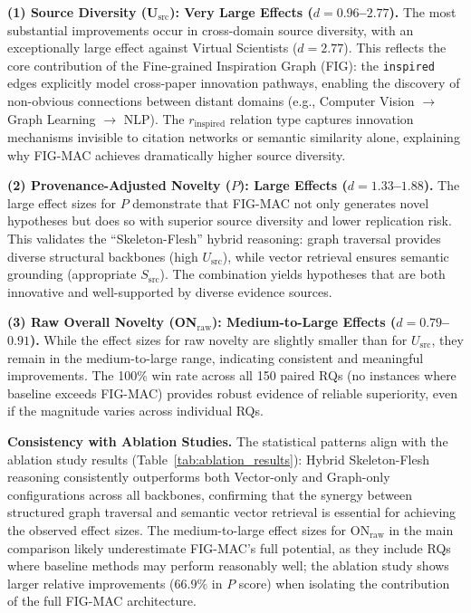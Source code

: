 \documentclass[runningheads]{llncs}
\begin{document}
\textbf{(1) Source Diversity (U$_{\text{src}}$): Very Large Effects ($d = 0.96$--$2.77$).} The most substantial improvements occur in cross-domain source diversity, with an exceptionally large effect against Virtual Scientists ($d = 2.77$). This reflects the core contribution of the Fine-grained Inspiration Graph (FIG): the \texttt{inspired} edges explicitly model cross-paper innovation pathways, enabling the discovery of non-obvious connections between distant domains (e.g., Computer Vision $\rightarrow$ Graph Learning $\rightarrow$ NLP). The $r_{\text{inspired}}$ relation type captures innovation mechanisms invisible to citation networks or semantic similarity alone, explaining why FIG-MAC achieves dramatically higher source diversity.

\textbf{(2) Provenance-Adjusted Novelty ($P$): Large Effects ($d = 1.33$--$1.88$).} The large effect sizes for $P$ demonstrate that FIG-MAC not only generates novel hypotheses but does so with superior source diversity and lower replication risk. This validates the ``Skeleton-Flesh'' hybrid reasoning: graph traversal provides diverse structural backbones (high $U_{\text{src}}$), while vector retrieval ensures semantic grounding (appropriate $S_{\text{src}}$). The combination yields hypotheses that are both innovative and well-supported by diverse evidence sources.

\textbf{(3) Raw Overall Novelty (ON$_{\text{raw}}$): Medium-to-Large Effects ($d = 0.79$--$0.91$).} While the effect sizes for raw novelty are slightly smaller than for $U_{\text{src}}$, they remain in the medium-to-large range, indicating consistent and meaningful improvements. The 100\% win rate across all 150 paired RQs (no instances where baseline exceeds FIG-MAC) provides robust evidence of reliable superiority, even if the magnitude varies across individual RQs.

\textbf{Consistency with Ablation Studies.} The statistical patterns align with the ablation study results (Table~\ref{tab:ablation_results}): Hybrid Skeleton-Flesh reasoning consistently outperforms both Vector-only and Graph-only configurations across all backbones, confirming that the synergy between structured graph traversal and semantic vector retrieval is essential for achieving the observed effect sizes. The medium-to-large effect sizes for ON$_{\text{raw}}$ in the main comparison likely underestimate FIG-MAC's full potential, as they include RQs where baseline methods may perform reasonably well; the ablation study shows larger relative improvements ($66.9\%$ in $P$ score) when isolating the contribution of the full FIG-MAC architecture.
\end{document}
